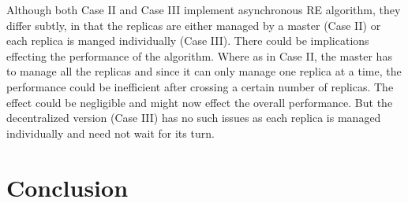\documentclass[a4paper,10pt]{article}
\newcommand{\jhanote}[1]{ {\textcolor{red} { ***shantenu: #1 }}}
\newcommand{\athotanote}[1]{ {\textcolor{green} { ***athota: #1 }}}
\newcommand{\jhanote}[1]{}
\newcommand{\athotanote}[1]{}
\begin{document}
Although both Case II and Case III implement asynchronous 
RE algorithm, they differ subtly, in that the replicas
are either managed by a master (Case II) or each replica
is manged individually (Case III).
There could be implications effecting the performance of the
algorithm. Where as in Case II, the master has to manage all the
replicas and since it can only manage one replica at a time, the
performance could be inefficient after crossing a certain number of
replicas. The effect could be negligible and might now effect the
overall performance. But the decentralized version (Case III) has no
such issues as each replica is managed individually and need not wait
for its turn. %
  

\section{Conclusion}





\end{document}
